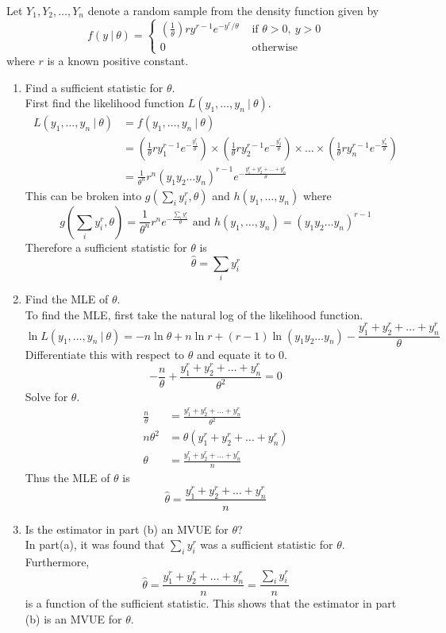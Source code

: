 \documentclass[12pt]{article}
\newcommand{\ques}[1]{\noindent {\bf Question #1: }}
\begin{document}
\ques{9.82} Let $Y_1,Y_2,\dots,Y_n$ denote a random sample from the density function given by 
$$ f(y~|~\theta) = \begin{cases} \left( \frac{1}{\theta} \right) ry^{r-1}e^{-y^r / \theta} &\text{ if } \theta > 0,~ y > 0 \\ 0 &\text{ otherwise} \end{cases} $$ 
where $r$ is a known positive constant.
\begin{enumerate}
\item Find a sufficient statistic for $\theta$. \\
First find the likelihood function $L(y_1,\dots,y_n ~|~ \theta)$. $$ \begin{aligned} L(y_1,\dots,y_n ~|~ \theta) &= f(y_1,\dots,y_n ~|~\theta) \\ &= \left( \frac{1}{\theta} ry_1^{r - 1} e^{-\frac{y_1^r}{\theta}} \right) \times \left( \frac{1}{\theta} ry_2^{r - 1} e^{-\frac{y_2^r}{\theta}} \right) \times \dots \times \left( \frac{1}{\theta} ry_n^{r - 1} e^{-\frac{y_n^r}{\theta}} \right) \\ &= \frac{1}{\theta^n} r^n(y_1y_2\dots y_n)^{r-1} e^{-\frac{y_1^r+y_2^r+\dots +y_n^r}{\theta}}  \end{aligned} $$ This can be broken into $g(\sum_i y_i^r, \theta)$ and $h(y_1,\dots,y_n)$ where $$ g(\sum_i y_i^r, \theta) = \frac{1}{\theta^n} r^n e^{-\frac{\sum_i y_i^r}{\theta}} \text{ and } h(y_1,\dots,y_n) = (y_1y_2\dots y_n)^{r-1} $$ 
Therefore a sufficient statistic for $\theta$ is $$ \hat{\theta} = \sum_i y_i^r $$

\newpage
\item Find the MLE of $\theta$. \\
To find the MLE, first take the natural log of the likelihood function.
$$ \ln L(y_1,\dots,y_n ~|~ \theta) = -n \ln \theta + n \ln r + (r-1) \ln(y_1y_2\dots y_n) - \frac{y_1^r + y_2^r + \dots + y_n^r}{\theta} $$ 
Differentiate this with respect to $\theta$ and equate it to $0$. 
$$ -\frac{n}{\theta} + \frac{y_1^r + y_2^r + \dots + y_n^r}{\theta^2} = 0 $$ 
Solve for $\theta$.
$$ \begin{aligned} \frac{n}{\theta} &= \frac{y_1^r + y_2^r + \dots + y_n^r}{\theta^2} \\ n\theta^2 &= \theta(y_1^r + y_2^r + \dots + y_n^r) \\ \theta &= \frac{y_1^r + y_2^r + \dots + y_n^r}{n} \end{aligned} $$ 
Thus the MLE of $\theta$ is $$ \hat{\theta} = \frac{y_1^r + y_2^r + \dots + y_n^r}{n} $$ 
\item Is the estimator in part (b) an MVUE for $\theta$? \\
In part(a), it was found that $\sum_i y_i^r$ was a sufficient statistic for $\theta$. Furthermore, $$\hat{\theta} = \frac{y_1^r + y_2^r + \dots + y_n^r}{n} = \frac{\sum_i y_i^r}{n}$$ is a function of the sufficient statistic. This shows that the estimator in part (b) is an MVUE for $\theta$.

\end{enumerate}
\end{document}
